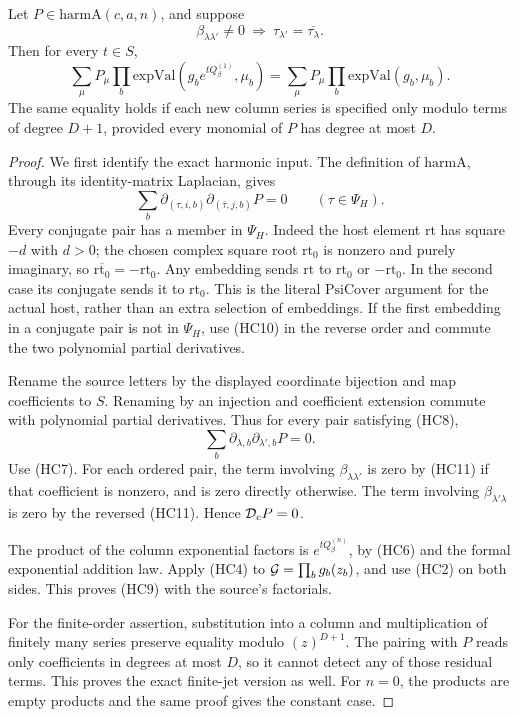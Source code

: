 \begin{srproposition}
\label{prop:sr-source-actual-column-harmonic-cancellation}
Let \(P\in\mathrm{harmA}(c,a,n)\), and suppose
\[
 \beta_{\lambda\lambda'}\ne0
               \ \Longrightarrow\
              \tau_{\lambda'}=\overline{\tau_\lambda}.
 \tag{HC8}
\]
Then for every \(t\in S\),
\[
 \sum_\mu P_\mu\prod_b
        \mathrm{expVal}(g_be^{tQ_\beta^{(1)}},\mu_b)
       =\sum_\mu P_\mu\prod_b\mathrm{expVal}(g_b,\mu_b).
 \tag{HC9}
\]
The same equality holds if each new column series
is specified only modulo terms of degree \(D+1\),
provided every monomial of \(P\) has degree at most \(D\).
\end{srproposition}
\begin{proof}
We first identify the exact harmonic input.
The definition of \(\mathrm{harmA}\), through its
identity-matrix Laplacian, gives
\[
 \sum_b\partial_{(\tau,i,b)}
                  \partial_{(\bar\tau,j,b)}P=0
                                  \qquad(\tau\in\Psi_H).   \tag{HC10}
\]
Every conjugate pair has a member in \(\Psi_H\).
Indeed the host element \(\mathrm{rt}\) has square
\(-d\) with \(d>0\); the chosen complex square root
\(\mathrm{rt}_0\) is nonzero and purely imaginary,
so \(\overline{\mathrm{rt}_0}=-\mathrm{rt}_0\).
Any embedding sends \(\mathrm{rt}\) to
\(\mathrm{rt}_0\) or \(-\mathrm{rt}_0\).
In the second case its conjugate sends it to
\(\mathrm{rt}_0\).
This is the literal \(\mathrm{PsiCover}\) argument
for the actual host, rather than an extra selection
of embeddings.
If the first embedding in a conjugate pair is not
in \(\Psi_H\), use (HC10) in the reverse order and
commute the two polynomial partial derivatives.

Rename the source letters by the displayed coordinate
bijection and map coefficients to \(S\).
Renaming by an injection and coefficient extension
commute with polynomial partial derivatives.
Thus for every pair satisfying (HC8),
\[
              \sum_b\partial_{\lambda,b}
                              \partial_{\lambda',b}P=0.   \tag{HC11}
\]
Use (HC7).
For each ordered pair, the term involving
\(\beta_{\lambda\lambda'}\) is zero by (HC11) if
that coefficient is nonzero, and is zero directly
otherwise.
The term involving \(\beta_{\lambda'\lambda}\)
is zero by the reversed (HC11).
Hence \({\cal D}_cP=0\).

The product of the column exponential factors is
\(e^{tQ_\beta^{(n)}}\), by (HC6) and the formal
exponential addition law.
Apply (HC4) to \({\cal G}=\prod_b g_b(z_b)\), and
use (HC2) on both sides.
This proves (HC9) with the source's factorials.

For the finite-order assertion, substitution into a
column and multiplication of finitely many series
preserve equality modulo \((z)^{D+1}\).
The pairing with \(P\) reads only coefficients in
degrees at most \(D\), so it cannot detect any of
those residual terms.
This proves the exact finite-jet version as well.
For \(n=0\), the products are empty products and the
same proof gives the constant case.
\end{proof}

